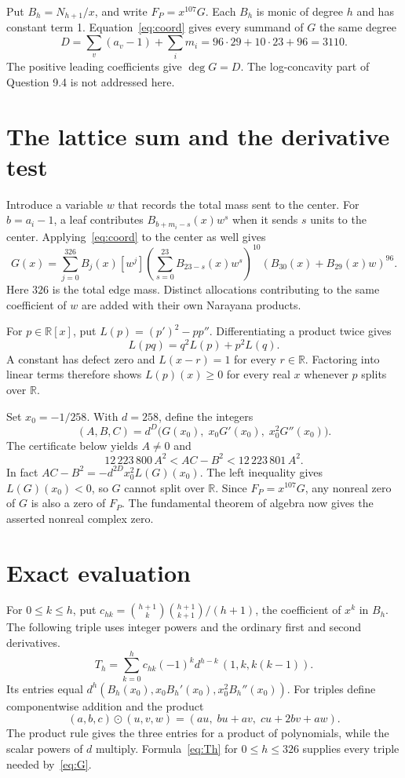 \documentclass[11pt]{article}
\newcommand{\R}{\mathbb R}
\newcommand{\bx}{x_0}
\begin{document}
Put \(B_h=N_{h+1}/x\), and write \(F_P=x^{107}G\). Each \(B_h\) is monic of degree \(h\) and has constant term 1. Equation~\eqref{eq:coord} gives every summand of \(G\) the same degree
\[
 D=\sum_v(a_v-1)+\sum_i m_i=96\cdot29+10\cdot23+96=3110.
\]
The positive leading coefficients give \(\deg G=D\). The log-concavity part of Question 9.4 is not addressed here.

\section{The lattice sum and the derivative test}
Introduce a variable \(w\) that records the total mass sent to the center. For \(b=a_i-1\), a leaf contributes \(B_{b+m_i-s}(x)w^s\) when it sends \(s\) units to the center. Applying~\eqref{eq:coord} to the center as well gives
\begin{equation}
 G(x)=\sum_{j=0}^{326} B_j(x)[w^j]\!
 \left(\sum_{s=0}^{23} B_{23-s}(x)w^s\right)^{10}
 \left(B_{30}(x)+B_{29}(x)w\right)^{96}.                          \label{eq:G}
\end{equation}
Here \(326\) is the total edge mass. Distinct allocations contributing to the same coefficient of \(w\) are added with their own Narayana products.

For \(p\in\R[x]\), put \(L(p)=(p')^2-pp''\). Differentiating a product twice gives
\[
 L(pq)=q^2L(p)+p^2L(q).
\]
A constant has defect zero and \(L(x-r)=1\) for every \(r\in\R\). Factoring into linear terms therefore shows \(L(p)(x)\ge0\) for every real \(x\) whenever \(p\) splits over \(\R\).

Set \(\bx=-1/258\). With \(d=258\), define the integers
\[
 (A,B,C)=d^D\bigl(G(\bx),\;\bx G'(\bx),\;\bx^2G''(\bx)\bigr).
\]
The certificate below yields \(A\ne0\) and
\begin{equation}
 12\,223\,800\,A^2 < AC-B^2 < 12\,223\,801\,A^2 .                \label{eq:bounds}
\end{equation}
In fact \(AC-B^2=-d^{2D}\bx^2L(G)(\bx)\). The left inequality gives \(L(G)(\bx)<0\), so \(G\) cannot split over \(\R\). Since \(F_P=x^{107}G\), any nonreal zero of \(G\) is also a zero of \(F_P\). The fundamental theorem of algebra now gives the asserted nonreal complex zero.

\section{Exact evaluation}\label{sec:exact}
For \(0\le k\le h\), put \(c_{hk}=\binom{h+1}{k}\binom{h+1}{k+1}/(h+1)\), the coefficient of \(x^k\) in \(B_h\). The following triple uses integer powers and the ordinary first and second derivatives.
\begin{equation}
 T_h=\sum_{k=0}^h c_{hk}(-1)^k d^{h-k}\,(1,k,k(k-1)).
                                                                    \label{eq:Th}
\end{equation}
Its entries equal \(d^h(B_h(\bx),\bx B_h'(\bx),\bx^2B_h''(\bx))\).
For triples define componentwise addition and the product
\[
 (a,b,c)\odot(u,v,w)=(au,\;bu+av,\;cu+2bv+aw).
\]
The product rule gives the three entries for a product of polynomials, while the scalar powers of \(d\) multiply. Formula~\eqref{eq:Th} for \(0\le h\le326\) supplies every triple needed by~\eqref{eq:G}.
\end{document}
